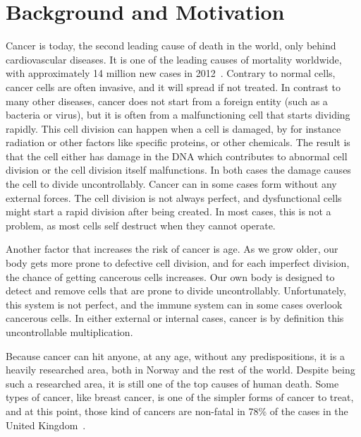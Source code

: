 \section{Background and Motivation}

Cancer is today, the second leading cause of death in the world, only behind cardiovascular diseases.  %
It is one of the leading causes of mortality worldwide, with approximately 14 million new cases in 2012~\cite{WHOCANCER}.
Contrary to normal cells, cancer cells are often invasive, and it will spread if not treated. 
In contrast to many other diseases, cancer does not start from a foreign entity (such as a bacteria or virus), but it is often from a malfunctioning cell that starts dividing rapidly. 
This cell division can happen when a cell is damaged, by for instance radiation or other factors like specific proteins, or other chemicals. The result is that the cell either has damage in the DNA which contributes to abnormal cell division or the cell division itself malfunctions. In both cases the damage causes the cell to divide uncontrollably. 
Cancer can in some cases form without any external forces. The cell division is not always perfect, and dysfunctional cells might start a rapid division after being created. In most cases, this is not a problem, as most cells self destruct when they cannot operate. 

Another factor that increases the risk of cancer is age. As we grow older, our body gets more prone to defective cell division, and for each imperfect division, the chance of getting cancerous cells increases.  
Our own body is designed to detect and remove cells that are prone to divide uncontrollably. Unfortunately, this system is not perfect, and the immune system can in some cases overlook cancerous cells.
In either external or internal cases, cancer is by definition this uncontrollable multiplication.




Because cancer can hit anyone, at any age, without any predispositions, it is a heavily researched area, both in Norway and the rest of the world. Despite being such a researched area, it is still one of the top causes of human death. 
Some types of cancer, like breast cancer, is one of the simpler forms of cancer to treat, and at this point, those kind of cancers are non-fatal in 78\% of the cases in the United Kingdom~\cite{UKCancer}. 
    
